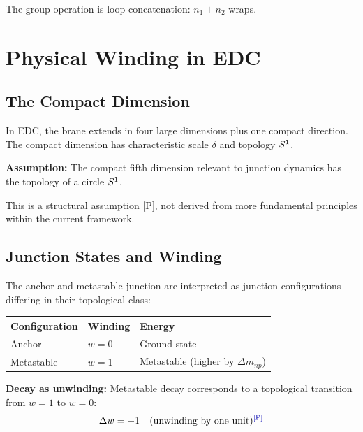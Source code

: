 The group operation is loop concatenation: $n_1 + n_2$ wraps.

\section{Physical Winding in EDC}
\label{sec:kappa:physical}

\subsection{The Compact Dimension}

In EDC, the brane extends in four large dimensions plus one compact direction.
The compact dimension has characteristic scale $\delta$ and topology $\Sone$.

\begin{edcopenbox}[title=Assumption: $\Sone$ Topology]
    \textbf{Assumption:} The compact fifth dimension relevant to junction
    dynamics has the topology of a circle $\Sone$.

    This is a structural assumption [P], not derived from more fundamental
    principles within the current framework. \tagP
\end{edcopenbox}

\subsection{Junction States and Winding}

The anchor and metastable junction are interpreted as junction configurations differing
in their topological class:

\begin{center}
\begin{tabular}{lll}
\toprule
Configuration & Winding & Energy \\
\midrule
Anchor & $w = 0$ & Ground state \\
Metastable & $w = 1$ & Metastable (higher by $\Delta m_{np}$) \\
\bottomrule
\end{tabular}
\end{center}

\textbf{Decay as unwinding:} Metastable decay corresponds to a topological
transition from $w = 1$ to $w = 0$:
\begin{equation}
    \Delta w = -1 \quad \text{(unwinding by one unit)}
    \label{eq:delta_w}
    \tagP
\end{equation}

